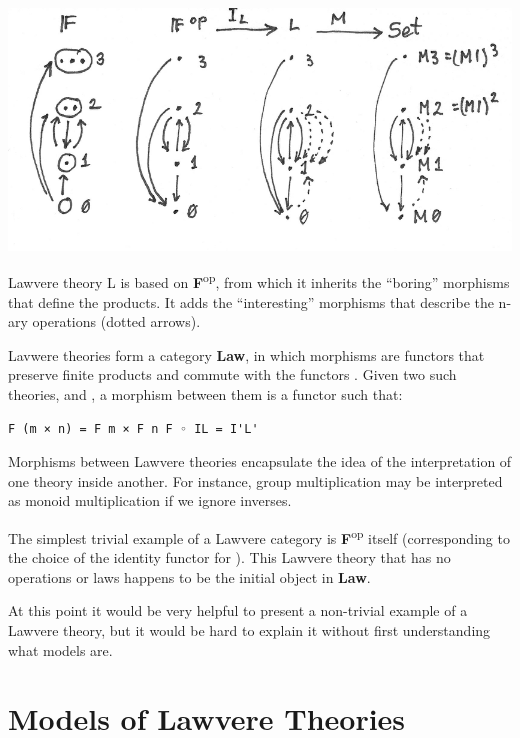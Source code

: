 \hypertarget{attachment_9070}{}
\includegraphics[width=5.31250in]{images/lawvere1.png}

Lawvere theory L is based on \textbf{F}\textsuperscript{op}, from which
it inherits the ``boring'' morphisms that define the products. It adds
the ``interesting'' morphisms that describe the n-ary operations (dotted
arrows).

Lavwere theories form a category \textbf{Law}, in which morphisms are
functors that preserve finite products and commute with the functors
. Given two such theories,  and
, a morphism between them is a
functor  such that:

\begin{verbatim}
F (m × n) = F m × F n F ◦ IL = I'L'
\end{verbatim}

Morphisms between Lawvere theories encapsulate the idea of the
interpretation of one theory inside another. For instance, group
multiplication may be interpreted as monoid multiplication if we ignore
inverses.

The simplest trivial example of a Lawvere category is
\textbf{F}\textsuperscript{op} itself (corresponding to the choice of
the identity functor for ). This Lawvere theory that has no
operations or laws happens to be the initial object in \textbf{Law}.

At this point it would be very helpful to present a non-trivial example
of a Lawvere theory, but it would be hard to explain it without first
understanding what models are.

\section{Models of Lawvere
Theories}\label{models-of-lawvere-theories}

